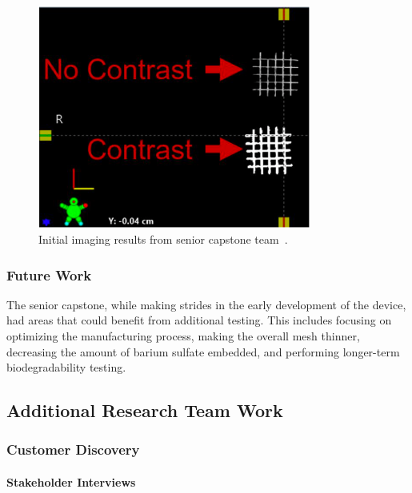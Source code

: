 \begin{figure}[h!]
        \centering
        \includegraphics[width=0.8\textwidth]{../figs/introduction/capstone_imaging_testing.png}
        \caption{Initial imaging results from senior capstone team~\cite{RefWorks:RefID:372-krakovskytumor}.}
        \label{fig:introduction:capstoneImagingTesting}
\end{figure}

\subsubsection{Future Work\label{sec:introduction:priorWork:seniorCapstone:futureWork}}

The senior capstone, while making strides in the early development of the device, had areas that could benefit from additional testing. This includes focusing on optimizing the manufacturing process, making the overall mesh thinner, decreasing the amount of barium sulfate embedded, and performing longer-term biodegradability testing.

\subsection{Additional Research Team Work\label{sec:introduction:priorWork:otherTeamWork}}

\subsubsection{Customer Discovery\label{sec:introduction:priorWork:otherTeamWork:customerDiscovery}}

\paragraph*{Stakeholder Interviews\label{sec:introduction:priorWork:otherTeamWork:customerDiscovery:interviews}}

